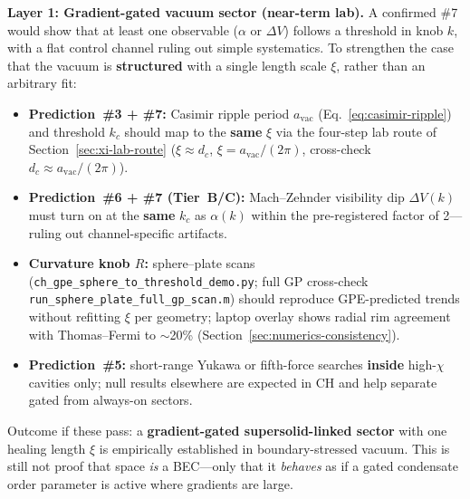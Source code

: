 \documentclass[11pt,a4paper]{article}
\begin{document}
\textbf{Layer 1: Gradient-gated vacuum sector (near-term lab).}
A confirmed \#7 would show that at least one observable ($\alpha$ or $\Delta V$) follows a threshold in knob $k$, with a flat control channel ruling out simple systematics.
To strengthen the case that the vacuum is \textbf{structured} with a single length scale $\xi$, rather than an arbitrary fit:
\begin{itemize}[leftmargin=*]
  \item \textbf{Prediction~\#3 + \#7:} Casimir ripple period $a_{\mathrm{vac}}$ (Eq.~\ref{eq:casimir-ripple}) and threshold $k_c$ should map to the \textbf{same} $\xi$ via the four-step lab route of Section~\ref{sec:xi-lab-route} ($\xi \approx d_c$, $\xi = a_{\mathrm{vac}}/(2\pi)$, cross-check $d_c \approx a_{\mathrm{vac}}/(2\pi)$).
  \item \textbf{Prediction~\#6 + \#7 (Tier~B/C):} Mach--Zehnder visibility dip $\Delta V(k)$ must turn on at the \textbf{same} $k_c$ as $\alpha(k)$ within the pre-registered factor of 2---ruling out channel-specific artifacts.
  \item \textbf{Curvature knob $R$:} sphere--plate scans (\texttt{ch\_gpe\_sphere\_to\_threshold\_demo.py}; full GP cross-check \texttt{run\_sphere\_plate\_full\_gp\_scan.m}) should reproduce GPE-predicted trends without refitting $\xi$ per geometry; laptop overlay shows radial rim agreement with Thomas--Fermi to $\sim$20\% (Section~\ref{sec:numerics-consistency}).
  \item \textbf{Prediction~\#5:} short-range Yukawa or fifth-force searches \textbf{inside} high-$\chi$ cavities only; null results elsewhere are expected in CH and help separate gated from always-on sectors.
\end{itemize}
Outcome if these pass: a \textbf{gradient-gated supersolid-linked sector} with one healing length $\xi$ is empirically established in boundary-stressed vacuum.
This is still not proof that space \emph{is} a BEC---only that it \emph{behaves} as if a gated condensate order parameter is active where gradients are large.
\end{document}
